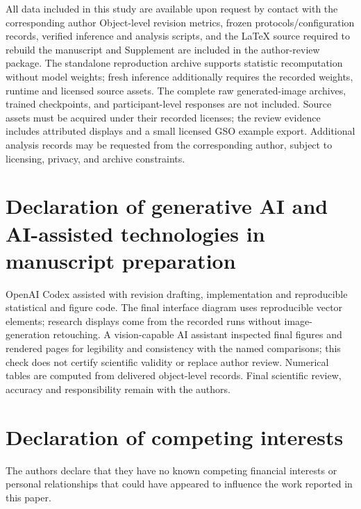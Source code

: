 \documentclass[times,twocolumn,final]{elsarticle}
\providecommand{\DIFadd}[1]{{\protect\color{blue} \sf #1}} %
\providecommand{\DIFdel}[1]{{\protect\color{red} \scriptsize #1}} %
\providecommand{\DIFaddbegin}{} %
\providecommand{\DIFaddend}{} %
\providecommand{\DIFdelbegin}{} %
\providecommand{\DIFdelend}{} %
\begin{document}
\DIFdelbegin \DIFdel{All data included in this study are available upon request by contact with the corresponding author}\DIFdelend \DIFaddbegin \DIFadd{Object-level revision metrics, frozen protocols/configuration records, verified inference and analysis scripts, and the LaTeX source required to rebuild the manuscript and Supplement are included in the author-review package. The standalone reproduction archive supports statistic recomputation without model weights; fresh inference additionally requires the recorded weights, runtime and licensed source assets. The complete raw generated-image archives, trained checkpoints, and participant-level responses are not included. Source assets must be acquired under their recorded licenses; the review evidence includes attributed displays and a small licensed GSO example export. Additional analysis records may be requested from the corresponding author, subject to licensing, privacy, and archive constraints.
}

\section*{\DIFadd{Declaration of generative AI and AI-assisted technologies in manuscript preparation}}
\DIFadd{OpenAI Codex assisted with revision drafting, implementation and reproducible statistical and figure code. The final interface diagram uses reproducible vector elements; research displays come from the recorded runs without image-generation retouching. A vision-capable AI assistant inspected final figures and rendered pages for legibility and consistency with the named comparisons; this check does not certify scientific validity or replace author review. Numerical tables are computed from delivered object-level records. Final scientific review, accuracy and responsibility remain with the authors}\DIFaddend .

\section*{Declaration of competing interests}

The authors declare that they have no known competing financial interests or personal relationships that could have appeared to influence the work reported in this paper.
\end{document}
